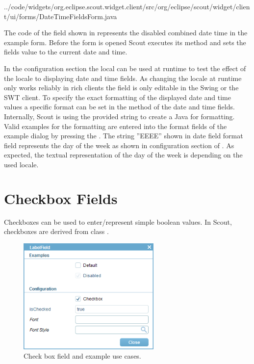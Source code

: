 \documentclass[a4paper,10pt,twoside]{book}
\begin{document}

{../code/widgets/org.eclipse.scout.widget.client/src/org/eclipse/scout/widget/client/ui/forms/DateTimeFieldsForm.java}

The code of the  field shown in  represents the disabled combined date time in the example form. 
Before the form is opened Scout executes its  method and sets the fields value to the current date and time. 

In the configuration section the local can be used at runtime to test the effect of the locale to displaying date and time fields. 
As changing the locale at runtime only works reliably in rich clients the field is only editable in the Swing or the SWT client. 
To specify the exact formatting of the displayed date and time values a specific format can be set in the  method of the date and time fields. 
Internally, Scout is using the provided string to create a Java  for formatting. 
Valid examples for the formatting are entered into the format fields of the example dialog by pressing the . 
The string ''EEEE'' shown in date field format field represents the day of the week as shown in configuration section of . 
As expected, the textual representation of the day of the week is depending on the used locale. 

\section{Checkbox Fields}

Checkboxes can be used to enter/represent simple boolean values. 
In Scout, checkboxes are derived from class . 

\begin{figure}
\includegraphics[width=7cm]{checkboxfield.png}
\caption{Check box field and example use cases.
}
\end{figure}
\end{document}
